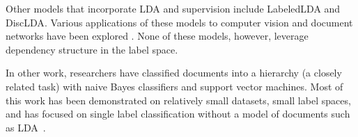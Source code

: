 Other models that incorporate LDA and supervision include
LabeledLDA\citep{Ramage2009} and DiscLDA\citep{DiscLDA}.  Various applications of these models to 
computer vision and document networks have been explored
\citep{wangbleifeifei08,RelationalLDA} .
None of these models, however, leverage dependency structure in the label space.

In other work, researchers have classified documents into a hierarchy (a closely related task) with naive Bayes classifiers
and support vector machines. Most of this work has been demonstrated on relatively
small datasets, small label spaces, and has focused on single label classification without
a model of documents such as LDA~\citep{mccallum99building,Dumais2000HCW,Kollerilprints291,Chakrabarti1998SFS}.


